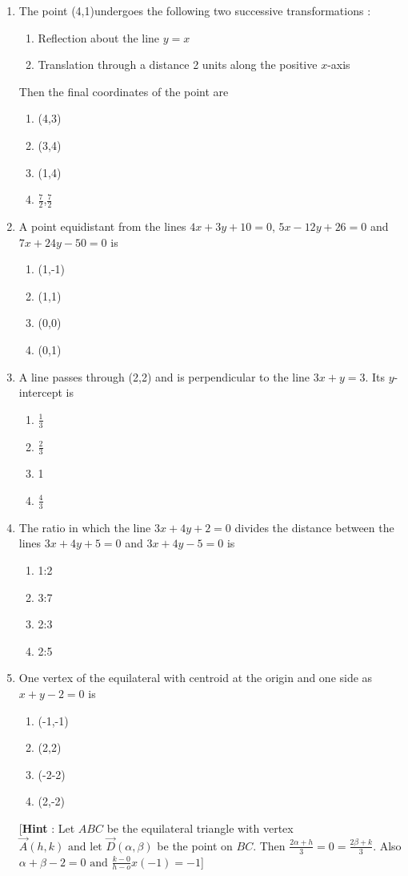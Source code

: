 \begin{enumerate}[resume]
\begin{enumerate}
\end{enumerate}
\item The point (4,1)undergoes the following two successive transformations :
\begin{enumerate}
\item Reflection about the line $y=x$
\item Translation through a distance 2 units along the positive $x$-axis 
\end{enumerate}
Then the final coordinates of the point are
\begin{enumerate}
\item (4,3)
\item (3,4)
\item (1,4)
\item $\frac{7}{2}$,$\frac{7}{2}$
\end{enumerate}
\item A point equidistant from the lines $4x+3y+10=0$, $5x-12y+26=0$ and $7x+24y-50=0$ is
\begin{enumerate}
\item (1,-1)
\item (1,1)
\item (0,0)
\item (0,1)
\end{enumerate}
\item A line passes through (2,2) and is perpendicular to the line $3x+y=3$. Its $y$-intercept is 
\begin{enumerate}
\item $\frac{1}{3}$
\item $\frac{2}{3}$
\item 1
\item $\frac{4}{3}$
\end{enumerate}
\item The ratio in which the line $3x+4y+2=0$ divides the distance between the lines $3x+4y+5=0$ and $3x+4y-5=0$ is
\begin{enumerate}
\item 1:2
\item 3:7
\item 2:3
\item 2:5
\end{enumerate}
\item One vertex of the equilateral with centroid at the origin and one side as $x+y-2=0$ is
\begin{enumerate}
\item (-1,-1)
\item (2,2)
\item (-2-2)
\item (2,-2)
\end{enumerate}
[\textbf{Hint} : Let $ABC$ be the equilateral triangle with vertex $\vec{A}(h,k)\text{ and let }\vec{D}(\alpha,\beta)$ be the point on $BC$. Then $\frac{2\alpha+h}{3}=0=\frac{2\beta+k}{3}$. Also ${\alpha+\beta-2=0}\text{ and }\frac{k-0}{h-o}x(-1)=-1$] 
\end{enumerate}


